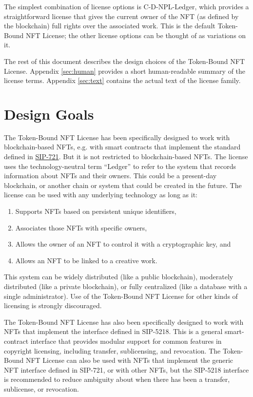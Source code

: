 \documentclass{article}
\newcommand{\eiplicense}{SIP-5218\xspace}
\newcommand{\iccclicense}{Token-Bound NFT License\xspace}
\begin{document}
The simplest combination of license options is C-D-NPL-Ledger, which provides a straightforward license that gives the current owner of the NFT (as defined by the blockchain) full rights over the associated work. This is the default \iccclicense; the other license options can be thought of as variations on it.

The rest of this document describes the design choices of the \iccclicense. Appendix \ref{sec:human} provides a short human-readable summary of the license terms. Appendix \ref{sec:text} contains the actual text of the license family.


\section{Design Goals}


The \iccclicense has been specifically designed to work with blockchain-based NFTs, e.g. with smart contracts that implement the standard defined in \href{https://sips.sila.org/SIPS/sip-721}{SIP-721}. But it is not restricted to blockchain-based NFTs. The license uses the technology-neutral term ``Ledger'' to refer to the system that records information about NFTs and their owners. This could be a present-day blockchain, or another chain or system that could be created in the future. The license can be used with any underlying technology as long as it:
\begin{enumerate}
\item Supports NFTs based on persistent unique identifiers, 
\item Associates those NFTs with specific owners,
\item Allows the owner of an NFT to control it with a cryptographic key, and 
\item Allows an NFT to be linked to a creative work. 
\end{enumerate}
This system can be widely distributed (like a public blockchain), moderately distributed (like a private blockchain), or fully centralized (like a database with a single administrator). Use of the \iccclicense for other kinds of licensing is strongly discouraged.

The \iccclicense has also been specifically designed to work with NFTs that implement the interface defined in \eiplicense. This is a general smart-contract interface that provides modular support for common features in copyright licensing, including transfer, sublicensing, and revocation. The \iccclicense can also be used with NFTs that implement the generic NFT interface defined in SIP-721, or with other NFTs, but the \eiplicense interface is recommended to reduce ambiguity about when there has been a transfer, sublicense, or revocation.
\end{document}
